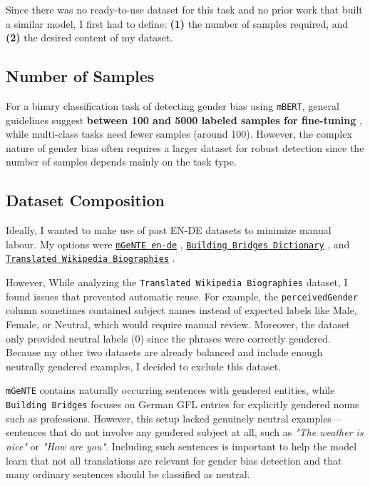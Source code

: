 Since there was no ready-to-use dataset for this task and no prior work that built a similar model, I first had to define: \textbf{(1)} the number of samples required,  and \textbf{(2)} the desired content of my dataset.

\subsection{Number of Samples}
For a binary classification task of detecting gender bias using \texttt{mBERT}, general guidelines suggest \textbf{between 100 and 5000 labeled samples for fine-tuning} \citep{pecherComparingSpecialisedSmall2024}, while multi-class tasks need fewer samples (around 100). However, the complex nature of gender bias often requires a larger dataset for robust detection since the number of samples depends mainly on the task type. 

\subsection{Dataset Composition}
Ideally, I wanted to make use of past EN-DE datasets to minimize manual labour. My options were \texttt{\href{https://huggingface.co/datasets/FBK-MT/mGeNTE}{mGeNTE en-de}} \citep{savoldiMGeNTEMultilingualResource2025}, \texttt{\href{https://github.com/g8a9/building-bridges-gender-fair-german-mt}{Building Bridges Dictionary}} \citep{lardelliBuildingBridgesDataset2024}, and \texttt{\href{https://research.google/blog/a-dataset-for-studying-gender-bias-in-translation/}{Translated Wikipedia Biographies}} \citep{stellaDatasetStudyingGender2021}. 

However, While analyzing the \texttt{Translated Wikipedia Biographies} dataset, I found issues that prevented automatic reuse. For example, the \texttt{perceivedGender} column sometimes contained subject names instead of expected labels like Male, Female, or Neutral, which would require manual review. Moreover, the dataset only provided neutral labels (0) since the phrases were correctly gendered. Because my other two datasets are already balanced and include enough neutrally gendered examples, I decided to exclude this dataset.

\texttt{mGeNTE} contains naturally occurring sentences with gendered entities, while \texttt{Building Bridges} focuses on German GFL entries for explicitly gendered nouns such as professions. However, this setup lacked genuinely neutral examples—sentences that do not involve any gendered subject at all, such as \textit{"The weather is nice"} or \textit{"How are you"}. Including such sentences is important to help the model learn that not all translations are relevant for gender bias detection and that many ordinary sentences should be classified as neutral.

